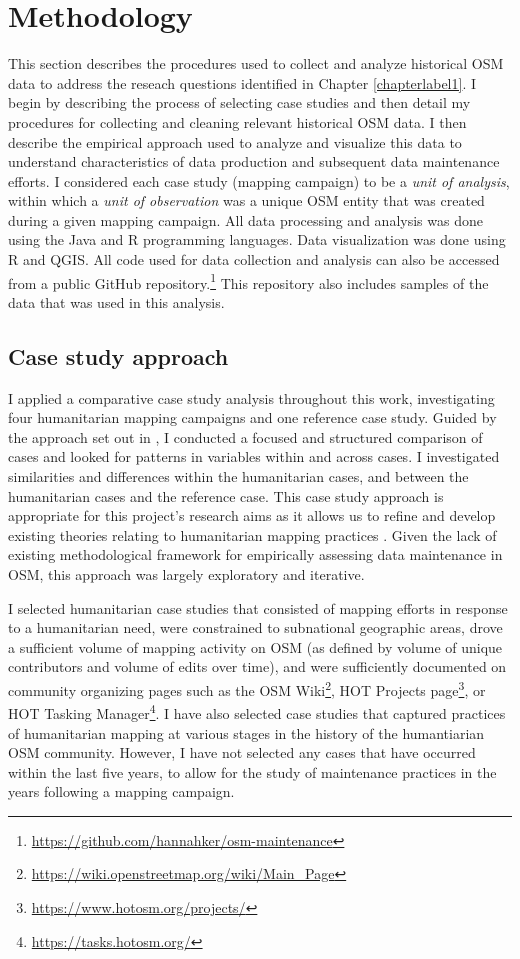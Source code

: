 \chapter{Methodology}
\label{chapterlabel4}

This section describes the procedures used to collect and analyze historical OSM data to address the reseach questions identified in Chapter \ref{chapterlabel1}. I begin by describing the process of selecting case studies and then detail my procedures for collecting and cleaning relevant historical OSM data. I then describe the empirical approach used to analyze and visualize this data to understand characteristics of data production and subsequent data maintenance efforts. I considered each case study (mapping campaign) to be a \textit{unit of analysis}, within which a \textit{unit of observation} was a unique OSM entity that was created during a given mapping campaign. All data processing and analysis was done using the Java and R programming languages. Data visualization was done using R and QGIS. All code used for data collection and analysis can also be accessed from a public GitHub repository.\footnote{\url{https://github.com/hannahker/osm-maintenance}} This repository also includes samples of the data that was used in this analysis. 

\section{Case study approach}

I applied a comparative case study analysis throughout this work, investigating four humanitarian mapping campaigns and one reference case study. Guided by the approach set out in \textcite{kaarbo_practical_1999}, I conducted a focused and structured comparison of cases and looked for patterns in variables within and across cases. I investigated similarities and differences within the humanitarian cases, and between the humanitarian cases and the reference case. This case study approach is appropriate for this project's research aims as it allows us to refine and develop existing theories relating to humanitarian mapping practices \parencite{kaarbo_practical_1999}. Given the lack of existing methodological framework for empirically assessing data maintenance in OSM, this approach was largely exploratory and iterative.

I selected humanitarian case studies that consisted of mapping efforts in response to a humanitarian need, were constrained to subnational geographic areas, drove a sufficient volume of mapping activity on OSM (as defined by volume of unique contributors and volume of edits over time), and were sufficiently documented on community organizing pages such as the OSM Wiki\footnote{\url{https://wiki.openstreetmap.org/wiki/Main_Page}}, HOT Projects page\footnote{\url{https://www.hotosm.org/projects/}}, or HOT Tasking Manager\footnote{\url{https://tasks.hotosm.org/}}. I have also selected case studies that captured practices of humanitarian mapping at various stages in the history of the humantiarian OSM community. However, I have not selected any cases that have occurred within the last five years, to allow for the study of maintenance practices in the years following a mapping campaign.  

